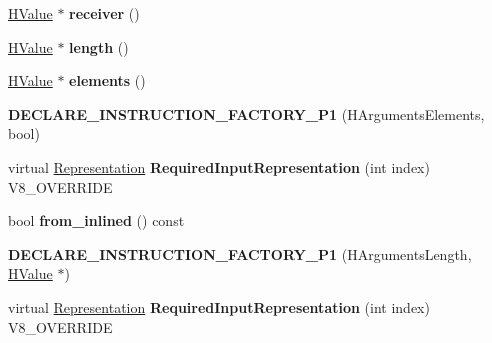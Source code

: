 \begin{DoxyCompactItemize}
\item 
\hypertarget{classv8_1_1internal_1_1_v8___f_i_n_a_l_a42384b30b9f38c81ea2fdc5a5e553a46}{}\hyperlink{classv8_1_1internal_1_1_h_value}{H\+Value} $\ast$ {\bfseries receiver} ()\label{classv8_1_1internal_1_1_v8___f_i_n_a_l_a42384b30b9f38c81ea2fdc5a5e553a46}

\item 
\hypertarget{classv8_1_1internal_1_1_v8___f_i_n_a_l_a0f9e823ed0e10dc126afe300b1c80e93}{}\hyperlink{classv8_1_1internal_1_1_h_value}{H\+Value} $\ast$ {\bfseries length} ()\label{classv8_1_1internal_1_1_v8___f_i_n_a_l_a0f9e823ed0e10dc126afe300b1c80e93}

\item 
\hypertarget{classv8_1_1internal_1_1_v8___f_i_n_a_l_a2b45597e0068a6adabe63cd1f22ea204}{}\hyperlink{classv8_1_1internal_1_1_h_value}{H\+Value} $\ast$ {\bfseries elements} ()\label{classv8_1_1internal_1_1_v8___f_i_n_a_l_a2b45597e0068a6adabe63cd1f22ea204}

\item 
\hypertarget{classv8_1_1internal_1_1_v8___f_i_n_a_l_a38b6fb9f4cc503f2a29c5ded4799d26d}{}{\bfseries D\+E\+C\+L\+A\+R\+E\+\_\+\+I\+N\+S\+T\+R\+U\+C\+T\+I\+O\+N\+\_\+\+F\+A\+C\+T\+O\+R\+Y\+\_\+\+P1} (H\+Arguments\+Elements, bool)\label{classv8_1_1internal_1_1_v8___f_i_n_a_l_a38b6fb9f4cc503f2a29c5ded4799d26d}

\item 
\hypertarget{classv8_1_1internal_1_1_v8___f_i_n_a_l_a6c6d1f37f40b113d8f4062f1ffff7215}{}virtual \hyperlink{classv8_1_1internal_1_1_representation}{Representation} {\bfseries Required\+Input\+Representation} (int index) V8\+\_\+\+O\+V\+E\+R\+R\+I\+D\+E\label{classv8_1_1internal_1_1_v8___f_i_n_a_l_a6c6d1f37f40b113d8f4062f1ffff7215}

\item 
\hypertarget{classv8_1_1internal_1_1_v8___f_i_n_a_l_a015ce1ade40c881774cecec243fdff8e}{}bool {\bfseries from\+\_\+inlined} () const \label{classv8_1_1internal_1_1_v8___f_i_n_a_l_a015ce1ade40c881774cecec243fdff8e}

\item 
\hypertarget{classv8_1_1internal_1_1_v8___f_i_n_a_l_a366c5ffff2f03a3b238ab17325047aa5}{}{\bfseries D\+E\+C\+L\+A\+R\+E\+\_\+\+I\+N\+S\+T\+R\+U\+C\+T\+I\+O\+N\+\_\+\+F\+A\+C\+T\+O\+R\+Y\+\_\+\+P1} (H\+Arguments\+Length, \hyperlink{classv8_1_1internal_1_1_h_value}{H\+Value} $\ast$)\label{classv8_1_1internal_1_1_v8___f_i_n_a_l_a366c5ffff2f03a3b238ab17325047aa5}

\item 
\hypertarget{classv8_1_1internal_1_1_v8___f_i_n_a_l_a6c6d1f37f40b113d8f4062f1ffff7215}{}virtual \hyperlink{classv8_1_1internal_1_1_representation}{Representation} {\bfseries Required\+Input\+Representation} (int index) V8\+\_\+\+O\+V\+E\+R\+R\+I\+D\+E\label{classv8_1_1internal_1_1_v8___f_i_n_a_l_a6c6d1f37f40b113d8f4062f1ffff7215}


\end{DoxyCompactItemize}
